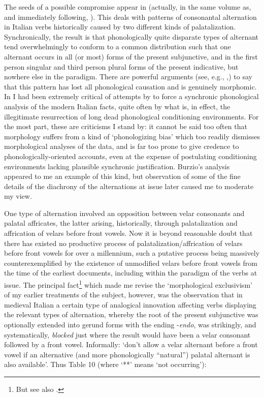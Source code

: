 \documentclass[output=paper,
modfonts
]{LSP/langsci}
\begin{document}
The seeds of a possible compromise appear in \citet{maiden2013a} (actually, in
the same volume as, and immediately following, \citealt{anderson2013stem}). This
deals with patterns of consonantal alternation in Italian verbs
historically caused by two different kinds of palatalization.
Synchronically, the result is that phonologically quite disparate types
of alternant tend overwhelmingly to conform to a common distribution
such that one alternant occurs in all (or most) forms of the present
subjunctive, and in the first person singular and third person plural
forms of the present indicative, but nowhere else in the paradigm. There
are powerful arguments (see, e.g., \citealt{maiden1992a},\citeyear{maiden2011a}\citeyear[205--63]{maiden2011c}) to
say that this pattern has lost all phonological causation and is
genuinely morphomic. In \citet{maiden2009a} I had been extremely critical of
attempts by \citet{burzio2004a} to force a synchronic phonological analysis of
the modern Italian facts, quite often by what is, in effect, the
illegitimate resurrection of long dead phonological conditioning
environments. For the most part, these are criticisms I stand by: it
cannot be said too often that morphology suffers from a kind of
`phonologizing bias' which too readily dismisses morphological analyses
of the data, and is far too prone to give credence to
phonologically-oriented accounts, even at the expense of postulating
conditioning environments lacking plausible synchronic justification.
Burzio's analysis appeared to me an example of this kind, but
observation of some of the fine details of the diachrony of the
alternations at issue later caused me to moderate my view.

One type of alternation involved an opposition between velar consonants
and palatal affricates, the latter arising, historically, through
palatalization and affrication of velars before front vowels. Now it is
beyond reasonable doubt that there has existed no productive process of
palatalization/affrication of velars before front vowels for over a
millennium, such a putative process being massively counterexemplified
by the existence of unmodified velars before front vowels from the time
of the earliest documents, including within the paradigm of the verbs at
issue. The principal fact\footnote{But see also \citet[31--35]{maiden2013a}.}
which made me revise \citep{maiden2013a} the `morphological exclusivism' of my
earlier treatments of the subject, however, was the observation that in
medieval Italian a certain type of analogical innovation affecting verbs
displaying the relevant types of alternation, whereby the root of the
present subjunctive was optionally extended into gerund forms with the
ending ­-\emph{endo}, was strikingly, and systematically, \emph{blocked}
just where the result would have been a velar consonant followed by a
front vowel. Informally: `don't allow a velar alternant before a front
vowel if an alternative (and more phonologically ``natural'') palatal
alternant is also available'. Thus Table 10 (where `**' means `not
occurring'):
\end{document}
